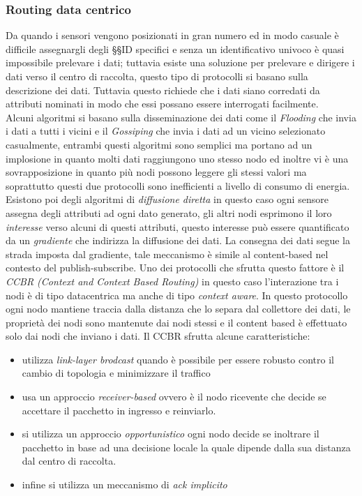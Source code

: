 \subsubsection{Routing data centrico}
Da quando i sensori vengono posizionati in gran numero ed in modo casuale è difficile assegnargli degli §§ID specifici e senza un identificativo univoco è quasi impossibile prelevare i dati; tuttavia esiste una soluzione per prelevare e dirigere i dati verso il centro di raccolta, questo tipo di protocolli si basano sulla descrizione dei dati. Tuttavia questo richiede che i dati siano corredati da attributi nominati in modo che essi possano essere interrogati facilmente.\\
Alcuni algoritmi si basano sulla disseminazione dei dati come il \emph{Flooding} che invia i dati a tutti i vicini e il \emph{Gossiping} che invia i dati ad un vicino selezionato casualmente, entrambi questi algoritmi sono semplici ma portano ad un implosione in quanto molti dati raggiungono uno stesso nodo ed inoltre vi è una sovrapposizione in quanto più nodi possono leggere gli stessi valori ma soprattutto questi due protocolli sono inefficienti a livello di consumo di energia.\\
Esistono poi degli algoritmi di \emph{diffusione diretta} in questo caso ogni sensore assegna degli attributi ad ogni dato generato, gli altri nodi esprimono il loro \emph{interesse} verso alcuni di questi attributi, questo interesse può essere quantificato da un \emph{gradiente} che indirizza la diffusione dei dati. La consegna dei dati segue la strada imposta dal gradiente, tale meccanismo è simile al content-based nel contesto del publish-subscribe. Uno dei protocolli che sfrutta questo fattore è il \emph{CCBR (Context and Context Based Routing)} in questo caso l'interazione tra i nodi è di tipo datacentrica ma anche di tipo \emph{context aware}. In questo protocollo ogni nodo mantiene traccia dalla distanza che lo separa dal collettore dei dati, le proprietà dei nodi sono mantenute dai nodi stessi e il content based è effettuato solo dai nodi che inviano i dati. Il CCBR sfrutta alcune caratteristiche:
\begin{itemize}
	\item utilizza \emph{link-layer brodcast} quando è possibile per essere robusto contro il cambio di topologia e minimizzare il traffico
	\item usa un approccio \emph{receiver-based} ovvero è il nodo ricevente che decide se accettare il pacchetto in ingresso e reinviarlo.
	\item si utilizza un approccio \emph{opportunistico} ogni nodo decide se inoltrare il pacchetto in base ad una decisione locale la quale dipende dalla sua distanza dal centro di raccolta.
	\item infine si utilizza un meccanismo di \emph{ack implicito}
\end{itemize}
